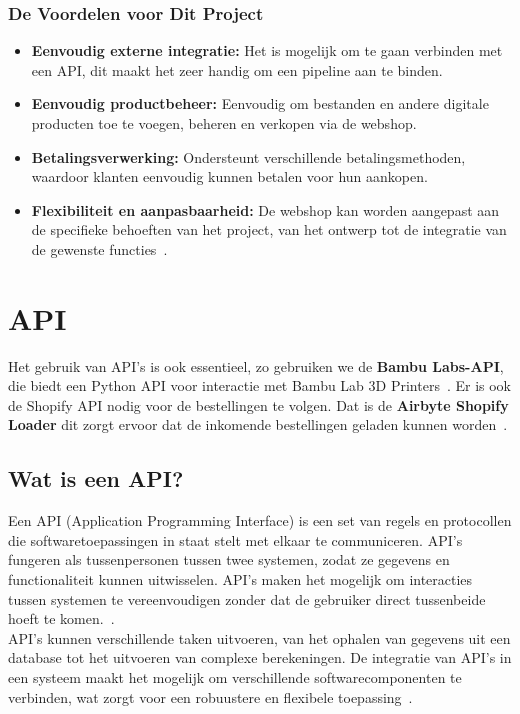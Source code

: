 \subsubsection{De Voordelen voor Dit Project}
\begin{itemize}
     \item \textbf{Eenvoudig externe integratie:} Het is mogelijk om te gaan verbinden met een API, dit maakt het zeer handig om een pipeline aan te binden.
    \item \textbf{Eenvoudig productbeheer:} Eenvoudig om bestanden en andere digitale producten toe te voegen, beheren en verkopen via de webshop.
    \item \textbf{Betalingsverwerking:} Ondersteunt verschillende betalingsmethoden, waardoor klanten eenvoudig kunnen betalen voor hun aankopen.
    \item \textbf{Flexibiliteit en aanpasbaarheid:} De webshop kan worden aangepast aan de specifieke behoeften van het project, van het ontwerp tot de integratie van de gewenste functies~\autocite{bang2024}.
\end{itemize}

\section{API}%
\label{sec:api}

Het gebruik van API’s is ook essentieel, zo gebruiken we de \textbf{Bambu Labs-API}, die biedt een Python API voor interactie met Bambu Lab 3D Printers~\autocite{bambulabsAPI}. Er is ook de Shopify API nodig voor de bestellingen te volgen. Dat is de \textbf{Airbyte Shopify Loader} dit zorgt ervoor dat de inkomende bestellingen geladen kunnen worden~\autocite{ilamaIndexShopify}. 

\subsection{Wat is een API?}

Een API (Application Programming Interface) is een set van regels en protocollen die softwaretoepassingen in staat stelt met elkaar te communiceren. API’s fungeren als tussenpersonen tussen twee systemen, zodat ze gegevens en functionaliteit kunnen uitwisselen. API’s maken het mogelijk om interacties tussen systemen te vereenvoudigen zonder dat de gebruiker direct tussenbeide hoeft te komen.~\autocite{aws2024}.\\

API’s kunnen verschillende taken uitvoeren, van het ophalen van gegevens uit een database tot het uitvoeren van complexe berekeningen. De integratie van API’s in een systeem maakt het mogelijk om verschillende softwarecomponenten te verbinden, wat zorgt voor een robuustere en flexibele toepassing~\autocite{rapidapi2024}.

